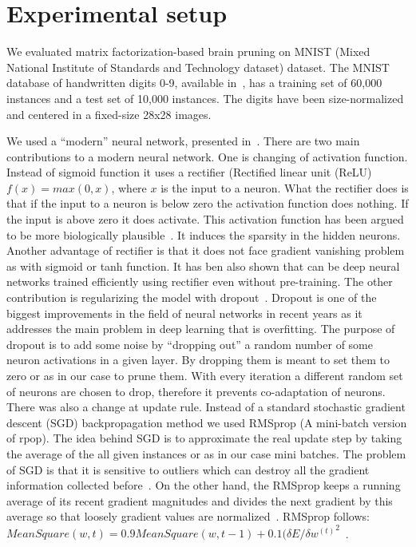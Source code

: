 \documentclass{article} %
\begin{document}
\section{Experimental setup}

We evaluated matrix factorization-based brain pruning on MNIST (Mixed National
Institute of Standards and Technology dataset) dataset. The MNIST database of
handwritten digits 0-9, available in~\cite{lecun-mnisthandwrittendigit-2010},
has a training set of 60,000 instances and a test set of 10,000 instances. The
digits have been size-normalized and centered in a fixed-size 28x28 images.

We used a “modern” neural network, presented in~\cite{github}. There are two
main contributions to a modern neural network. One is changing of activation
function. Instead of sigmoid function it uses a rectifier (Rectified linear
unit (ReLU) $f(x) = max(0, x)$, where $x$ is the input to a neuron. What the
rectifier does is that if the input to a neuron is below zero the activation
function does nothing. If the input is above zero it does activate. This
activation function has been argued to be more biologically
plausible~\cite{AISTATS2011_GlorotBB11}. It induces the sparsity in the hidden
neurons. Another advantage of rectifier is that it does not face gradient
vanishing problem as with sigmoid or tanh function. It has ben also shown that
can be deep neural networks trained efficiently using rectifier even without
pre-training. The other contribution is regularizing the model with
dropout~\cite{srivastava2014dropout}. Dropout is one of the biggest
improvements in the field of neural networks in recent years as it addresses
the main problem in deep learning that is overfitting. The purpose of dropout
is to add some noise by “dropping out” a random number of some neuron
activations in a given layer. By dropping them is meant to set them to zero or
as in our case to prune them. With every iteration a different random set of
neurons are chosen to drop, therefore it prevents co-adaptation of neurons.
There was also a change at update rule. Instead of a standard stochastic
gradient descent (SGD) backpropagation method we used RMSprop (A mini-batch
version of rpop). The idea behind SGD is to approximate the real update step by
taking the average of the all given instances or as in our case mini batches.
The problem of SGD is that it is sensitive to outliers which can destroy all
the gradient information collected before~\cite{erogol}. On the other hand, the
RMSprop keeps a running average of its recent gradient magnitudes and divides
the next gradient by this average so that loosely gradient values are
normalized~\cite{lecture}. RMSprop follows: $MeanSquare(w, t) = 0.9
MeanSquare(w, t-1) + 0.1 {({\delta E}/{\delta w^{(t)}}}^2$~\cite{lecture}.
\end{document}
